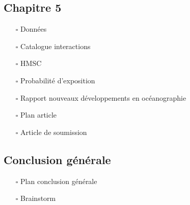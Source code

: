 \hypertarget{chapitre-5}{%
\subsection{Chapitre 5}\label{chapitre-5}}

\begin{itemize}
\tightlist
\item[$\square$]
  Données
\item[$\square$]
  Catalogue interactions
\item[$\square$]
  HMSC
\item[$\square$]
  Probabilité d'exposition
\item[$\square$]
  Rapport nouveaux développements en océanographie
\item[$\square$]
  Plan article
\item[$\square$]
  Article de soumission
\end{itemize}

\hypertarget{conclusion-guxe9nuxe9rale}{%
\subsection{Conclusion générale}\label{conclusion-guxe9nuxe9rale}}

\begin{itemize}
\tightlist
\item[$\square$]
  Plan conclusion générale
\item[$\square$]
  Brainstorm
\end{itemize}
